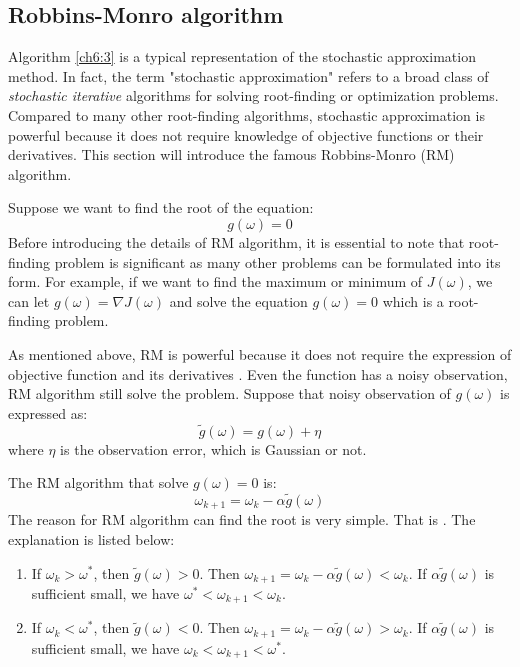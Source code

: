 \subsection{Robbins-Monro algorithm}

  Algorithm \ref{ch6:3} is a typical representation of the stochastic approximation method. In fact, the term "stochastic
  approximation" refers to a broad class of \emph{stochastic iterative} algorithms for solving root-finding or
  optimization problems. Compared to many other root-finding algorithms, stochastic approximation is powerful because it
  does not require knowledge of objective functions or their derivatives. This section will introduce the famous
  Robbins-Monro (RM) algorithm. \par

  Suppose we want to find the root of the equation:
  \begin{equation*}
    g(\omega) = 0
  \end{equation*}
  Before introducing the details of RM algorithm, it is essential to note that root-finding problem is significant as many
  other problems can be formulated into its form. For example, if we want to find the maximum or minimum of $J(\omega)$,
  we can let $g(\omega) = \nabla J(\omega)$ and solve the equation $g(\omega)=0$ which is a root-finding problem. \par As
  mentioned above, RM is powerful because it does not require the expression of objective function and its derivatives
  . Even the function
  has a noisy observation, RM algorithm still solve the problem. Suppose that noisy observation of $g(\omega)$ is
  expressed as:
  \begin{equation*}
    \tilde{g}(\omega) = g(\omega) + \eta
  \end{equation*}
  where $\eta$ is the observation error, which is Gaussian or not. \par The RM algorithm that solve $g(\omega)=0$ is:
  \begin{equation}
    \label{rm_algorithm}
    \omega_{k+1}=\omega_{k}-\alpha\tilde{g}(\omega)
  \end{equation}
  The reason for RM algorithm can find the root is very simple. That is {}. The explanation is listed below:
  \begin{enumerate}

    \item
          If $\omega_{k}>\omega^{*}$, then $\tilde{g}(\omega)>0$. Then
          $\omega_{k+1}=\omega_{k}-\alpha\tilde{g}(\omega)<\omega_{k}$. If $\alpha\tilde{g}(\omega)$ is sufficient small, we
          have $\omega^{*}<\omega_{k+1}<\omega_{k}$.
    \item
          If $\omega_{k}<\omega^{*}$, then $\tilde{g}(\omega)<0$. Then
          $\omega_{k+1}=\omega_{k}-\alpha\tilde{g}(\omega)>\omega_{k}$. If $\alpha\tilde{g}(\omega)$ is sufficient small, we
          have $\omega_{k}<\omega_{k+1}<\omega^{*}$.

  \end{enumerate}

